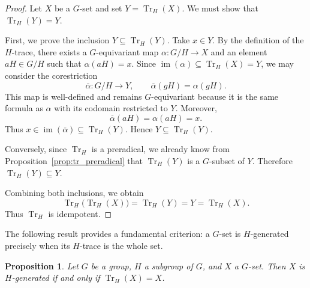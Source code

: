 \documentclass{amsart}
\newtheorem{proposition}{Proposition}
\begin{document}
\begin{proof}
Let $X$ be a $G$-set and set $Y = \operatorname{Tr}_H(X)$. We must show that $\operatorname{Tr}_H(Y) = Y$.

First, we prove the inclusion $Y \subseteq \operatorname{Tr}_H(Y)$. Take $x \in Y$. By the definition of the $H$-trace, there exists a $G$-equivariant map $\alpha \colon G/H \longrightarrow X$ and an element $aH \in G/H$ such that $\alpha(aH) = x$. Since $\operatorname{im}(\alpha) \subseteq \operatorname{Tr}_H(X) = Y$, we may consider the corestriction
\[
\overline{\alpha} \colon G/H \longrightarrow Y, \qquad \overline{\alpha}(gH) = \alpha(gH).
\]
This map is well-defined and remains $G$-equivariant because it is the same formula as $\alpha$ with its codomain restricted to $Y$. Moreover,
\[
\overline{\alpha}(aH) = \alpha(aH) = x.
\]
Thus $x \in \operatorname{im}(\overline{\alpha}) \subseteq \operatorname{Tr}_H(Y)$. Hence $Y \subseteq \operatorname{Tr}_H(Y)$.

Conversely, since $\operatorname{Tr}_H$ is a preradical, we already know from Proposition~\ref{prop:tr_preradical} that $\operatorname{Tr}_H(Y)$ is a $G$-subset of $Y$. Therefore $\operatorname{Tr}_H(Y) \subseteq Y$.

Combining both inclusions, we obtain
\[
\operatorname{Tr}_H\bigl(\operatorname{Tr}_H(X)\bigr) = \operatorname{Tr}_H(Y) = Y = \operatorname{Tr}_H(X).
\]
Thus $\operatorname{Tr}_H$ is idempotent.
\end{proof}

The following result provides a fundamental criterion: a $G$-set is $H$-generated precisely when its $H$-trace is the whole set.

\begin{proposition}\label{prop:H_generated_trace_criterion}
Let $G$ be a group, $H$ a subgroup of $G$, and $X$ a $G$-set. Then $X$ is $H$-generated if and only if $\operatorname{Tr}_H(X) = X$.
\end{proposition}
\end{document}
